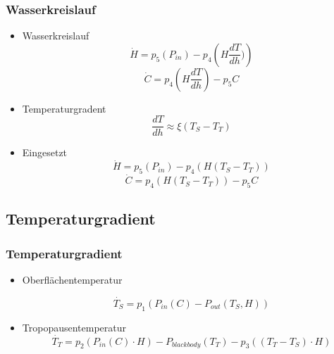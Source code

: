 \documentclass{beamer}
\begin{document}
\begin{frame}
	\frametitle{Wasserkreislauf}
	\begin{itemize}
	
		\item[] Wasserkreislauf
			\begin{equation}
			\dot{H} = p_5 (P_{in}) - p_4 \left( H \frac{dT}{dh}) \right)
			\end{equation}
			\begin{equation}	
			\dot{C} = p_4 \left( H \frac{dT}{dh} \right) - p_5 C
			\end{equation}		
	
		\item[] Temperaturgradent
			\begin{equation}
			\frac{dT}{dh} \approx \xi (T_S - T_T)
			\end{equation}
		
		\item[] Eingesetzt
			\begin{equation}
			\dot{H} = p_5 (P_{in}) - p_4 \left( H(T_S - T_T) \right)
			\end{equation}
			\begin{equation}	
			\dot{C} = p_4 \left( H(T_S - T_T) \right) - p_5 C
			\end{equation}		
		
	\end{itemize}
\end{frame}

\subsection{Temperaturgradient}

\begin{frame}
	\frametitle{Temperaturgradient}
	\begin{itemize}
		\item[] Oberflächentemperatur
		
			\begin{equation}
			\dot{T_S} = p_1 \left( P_{in}(C) - P_{out}(T_S, H) \right)
			\end{equation}
		\item[] Tropopausentemperatur
			\begin{equation}	
			\dot{T_T} = p_2 \left( P_{in}(C) \cdot H \right) - P_{blackbody}(T_T) - p_3 \left( (T_T - T_S) \cdot H \right)
			\end{equation}		
		
	\end{itemize}
\end{frame}
\end{document}
